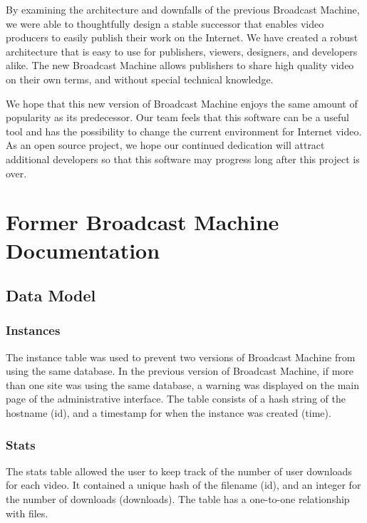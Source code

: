 \documentclass[a4paper,12pt]{report}
\begin{document}
By examining the architecture and downfalls of the previous Broadcast Machine, we were able to thoughtfully design a stable successor that 
enables video producers to easily publish their work on the Internet. We have created a robust architecture that is easy to use for publishers, viewers, designers, and developers alike. The new Broadcast Machine allows publishers to share high quality video on their own terms, and without special technical knowledge.

We hope that this new version of Broadcast Machine enjoys the same amount of popularity as its predecessor.
Our team feels that this software can be a useful tool and has the possibility to change the current environment for Internet video.
As an open source project, we hope our continued dedication will attract additional developers so that this software may progress long after this project is over.

\appendix
\chapter{Former Broadcast Machine Documentation}

\section{Data Model}


\subsection{Instances}
The instance table was used to prevent two versions of Broadcast Machine from using the same database. In the previous version of Broadcast Machine, if more than one site was using the same database, a warning was displayed on the main page of the administrative interface. The table consists of a hash string of the hostname (id), and a timestamp for when the instance was created (time). 


\subsection{Stats}
The stats table allowed the user to keep track of the number of user downloads for each video. It contained a unique hash of the filename (id), and an integer for the number of downloads (downloads). The table has a one-to-one relationship with files.
\end{document}
